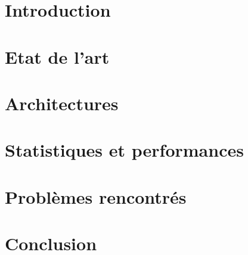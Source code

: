 \documentclass[14pt,a4paper,titlepage]{report}
\begin{document}

\renewcommand\headrulewidth{2pt}

\newpage
\pagestyle{empty}
\tableofcontents

\newpage
\chapter{Introduction}
\thispagestyle{fancy}



\chapter{Etat de l'art}
\thispagestyle{fancy}



\chapter{Architectures}
\thispagestyle{fancy}



\chapter{Statistiques et performances}
\thispagestyle{fancy}



\chapter{Problèmes rencontrés }
\thispagestyle{fancy}


\chapter{Conclusion}
\thispagestyle{fancy}

\end{document}
